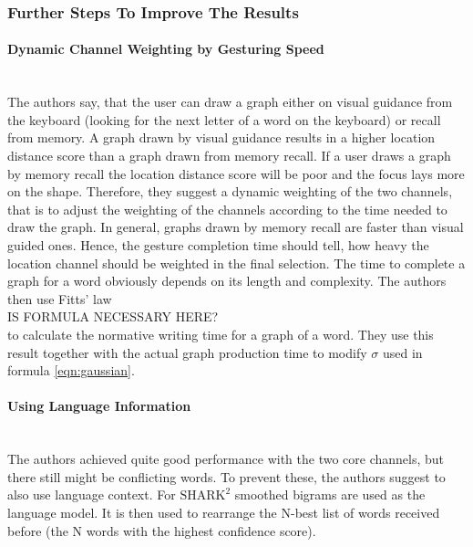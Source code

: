 \subsubsection{Further Steps To Improve The Results}
\paragraph{Dynamic Channel Weighting by Gesturing Speed}\ \\
\label{gesturing speed}
The authors say, that the user can draw a graph either on visual guidance from the keyboard (looking for the next letter of a word on the keyboard) or recall from memory. A graph drawn by visual guidance results in a higher location distance score than a graph drawn from memory recall. If a user draws a graph by memory recall the location distance score will be poor and the focus lays more on the shape. Therefore, they suggest a dynamic weighting of the two channels, that is to adjust the weighting of the channels according to the time needed to draw the graph. In general, graphs drawn by memory recall are faster than visual guided ones. Hence, the gesture completion time should tell, how heavy the location channel should be weighted in the final selection. The time to complete a graph for a word obviously depends on its length and complexity. The authors then use Fitts' law\\
IS FORMULA NECESSARY HERE?\\
to calculate the normative writing time for a graph of a word. They use this result together with the actual graph production time to modify $\sigma$ used in formula \ref{eqn:gaussian}.\\
\paragraph{Using Language Information}\ \\
The authors achieved quite good performance with the two core channels, but there still might be conflicting words. To prevent these, the authors suggest to also use language context. For $\text{SHARK}^2$ smoothed bigrams are used as the language model. It is then used to rearrange the N-best list of words received before (the N words with the highest confidence score).